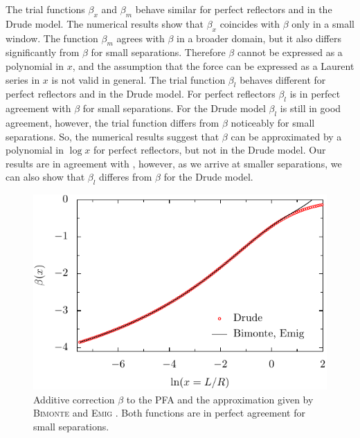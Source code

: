 The trial functions $\beta_x$ and $\beta_m$ behave similar for perfect reflectors
and in the Drude model. The numerical results show that $\beta_x$ coincides
with $\beta$ only in a small window. The function $\beta_m$ agrees with $\beta$
in a broader domain, but it also differs significantly from $\beta$ for small
separations. Therefore $\beta$ cannot be expressed as a polynomial in $x$, and
the assumption that the force can be expressed as a Laurent series in $x$ is
not valid in general. The trial function $\beta_l$ behaves different for perfect
reflectors and in the Drude model. For perfect reflectors $\beta_l$ is in
perfect agreement with $\beta$ for small separations. For the Drude model
$\beta_l$ is still in good agreement, however, the trial function differs from
$\beta$ noticeably for small separations. So, the numerical results suggest
that $\beta$ can be approximated by a polynomial in $\log x$ for perfect
reflectors, but not in the Drude model. Our results are in agreement with
\cite{PhysRevA.85.052501}, however, as we arrive at smaller separations, we can
also show that $\beta_l$ differes from $\beta$ for the Drude model.

\begin{figure}
    \begin{center}
    \includegraphics[scale=1]{plots/hiT/hiT_7_beta_vs_lnx_drude_bimonte.pdf}
    \end{center}

    \caption{Additive correction $\beta$ to the PFA and the approximation given by \textsc{Bimonte} and \textsc{Emig} \cite{PhysRevLett.109.160403}.
    Both functions are in perfect agreement for small separations.}
    \label{temp_hiT_emigbimonte}
\end{figure}


